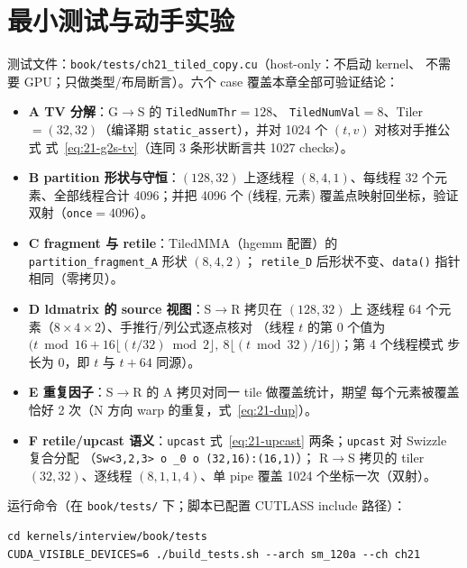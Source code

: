 \section{最小测试与动手实验}

测试文件：\texttt{book/\allowbreak{}tests/\allowbreak{}ch21\_\allowbreak{}tiled\_\allowbreak{}copy.cu}（host-only：不启动 kernel、
不需要 GPU；只做类型/布局断言）。六个 case 覆盖本章全部可验证结论：

\begin{itemize}
  \item \textbf{A TV 分解}：G$\to$S 的 \texttt{TiledNumThr}$=128$、
        \texttt{TiledNumVal}$=8$、Tiler$=(32,32)$（编译期
        \texttt{static\_\allowbreak{}assert}），并对 1024 个 $(t,v)$ 对核对手推公式
        式~\eqref{eq:21-g2s-tv}（连同 3 条形状断言共 1027 checks）。
  \item \textbf{B partition 形状与守恒}：$(128,32)$ 上逐线程
        $(8,4,1)$、每线程 32 个元素、全部线程合计 4096；并把 4096 个
        (线程, 元素) 覆盖点映射回坐标，验证双射（\texttt{once}$=4096$）。
  \item \textbf{C fragment 与 retile}：TiledMMA（hgemm 配置）的
        \texttt{partition\_\allowbreak{}fragment\_\allowbreak{}A} 形状 $(8,4,2)$；
        \texttt{retile\_D} 后形状不变、\texttt{data()} 指针相同（零拷贝）。
  \item \textbf{D ldmatrix 的 source 视图}：S$\to$R 拷贝在 $(128,32)$ 上
        逐线程 64 个元素（$8\times4\times2$）、手推行/列公式逐点核对
        （线程 $t$ 的第 0 个值为 $\bigl(t\bmod 16 + 16\lfloor (t/32)\bmod
        2\rfloor,\ 8\lfloor (t\bmod 32)/16\rfloor\bigr)$；第 4 个线程模式
        步长为 0，即 $t$ 与 $t+64$ 同源）。
  \item \textbf{E 重复因子}：S$\to$R 的 A 拷贝对同一 tile 做覆盖统计，期望
        每个元素被覆盖恰好 2 次（N 方向 warp 的重复，式~\eqref{eq:21-dup}）。
  \item \textbf{F retile/upcast 语义}：\texttt{upcast} 式~\eqref{eq:21-upcast}
        两条；\texttt{upcast} 对 Swizzle 复合分配
        （\texttt{Sw\allowbreak{}<3,\allowbreak{}2,\allowbreak{}3>\ o \_\allowbreak{}0\ o\ \allowbreak{}(32,\allowbreak{}16):\allowbreak{}(16,\allowbreak{}1)}）；
        R$\to$S 拷贝的 tiler$(32,32)$、逐线程 $(8,1,1,4)$、单 pipe 覆盖
        1024 个坐标一次（双射）。
\end{itemize}

运行命令（在 \texttt{book/tests/} 下；脚本已配置 CUTLASS include 路径）：

\begin{lstlisting}[style=console]
cd kernels/interview/book/tests
CUDA_VISIBLE_DEVICES=6 ./build_tests.sh --arch sm_120a --ch ch21
\end{lstlisting}

